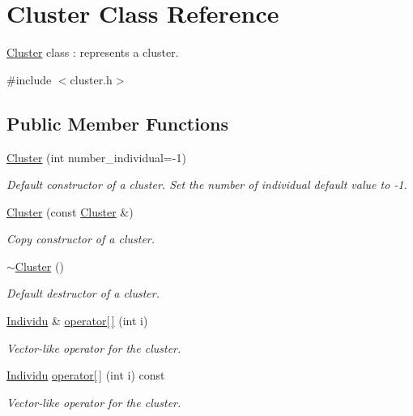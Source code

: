 \hypertarget{class_cluster}{}\section{Cluster Class Reference}
\label{class_cluster}


\hyperlink{class_cluster}{Cluster} class \+: represents a cluster.  




{\ttfamily \#include $<$cluster.\+h$>$}

\subsection*{Public Member Functions}
\begin{DoxyCompactItemize}
\item 
\hyperlink{class_cluster_a6222a2684fffeb2ece34f556283e1299}{Cluster} (int number\+\_\+individual=-\/1)
\begin{DoxyCompactList}\small\item\em Default constructor of a cluster. Set the number of individual default value to -\/1. \end{DoxyCompactList}\item 
\hyperlink{class_cluster_a9f8b93e2cd87180f6518571c654a6a0a}{Cluster} (const \hyperlink{class_cluster}{Cluster} \&)
\begin{DoxyCompactList}\small\item\em Copy constructor of a cluster. \end{DoxyCompactList}\item 
\hyperlink{class_cluster_a4bddfc88ac859610acab15dd12851b58}{$\sim$\+Cluster} ()
\begin{DoxyCompactList}\small\item\em Default destructor of a cluster. \end{DoxyCompactList}\item 
\hyperlink{class_individu}{Individu} \& \hyperlink{class_cluster_a9460341680f84e640ad6744d97088948}{operator\mbox{[}$\,$\mbox{]}} (int i)
\begin{DoxyCompactList}\small\item\em Vector-\/like operator for the cluster. \end{DoxyCompactList}\item 
\hyperlink{class_individu}{Individu} \hyperlink{class_cluster_a18e8355ff8f934e5e3deb10c1b7ec0f6}{operator\mbox{[}$\,$\mbox{]}} (int i) const
\begin{DoxyCompactList}\small\item\em Vector-\/like operator for the cluster. \end{DoxyCompactList}\item 

\end{DoxyCompactItemize}
